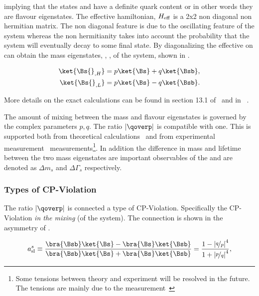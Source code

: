 \noindent implying that the states \Bs and \Bsb have a definite quark content or in other words
they are flavour eigenstates. The effective hamiltonian, $H_{\rm eff}$ is a 2x2 non diagonal non hermitian matrix.
The non diagonal feature is due to the oscillating feature of the \BBbarSyst system whereas the non
hermitianity takes into account the probability that the system will eventually decay to some final state.
By diagonalizing the effective on can obtain the mass eigenstates, , , of the system, shown in .

\begin{align}
 \ket{\Bs{}_{,H}} &= p \ket{\Bs} + q \ket{\Bsb}, \nonumber \\
 \ket{\Bs{}_{,L}} &= p \ket{\Bs} - q \ket{\Bsb}.
\label{bs_mass_eigen}
\end{align}

More details on the exact calculations can be found in section 13.1 of~\cite{PDG} and in ~\cite{jeroenThesis,DeBruyn-thesis}.

The amount of mixing between the mass and flavour eigenstates is governed by the complex parameters $p,q$.
The ratio $|\qoverp|$ is compatible with one. This is supported both from theoretical calculations~\cite{Lenz:2011ti}
and from experimental measurement~\cite{asl-paper} measurements\footnote{Some tensions between theory and experiment will be resolved in the future. The tensions are
mainly due to the \dzero measurement~\cite{Abazov:2013uma}}. In addition the difference in mass and lifetime between the two
mass eigenstates are important observables of the \BBbarSyst and are denoted as $\Delta m_s$ and $\Delta\Gamma_s$ respectively.

\subsubsection{Types of CP-Violation}
The ratio $|\qoverp|$ is connected a type of CP-Violation. Specifically the CP-Violation {\it in the mixing} (of the \BBbarSyst system).
The connection is shown in the asymmetry of .

\begin{equation}
a_{\rm sl}^{s}  \equiv \frac{\bra{\Bsb}\ket{\Bs} - \bra{\Bs}\ket{\Bsb}} {\bra{\Bsb}\ket{\Bs} + \bra{\Bs}\ket{\Bsb}}
                     = \frac{1 - \left|\nicefrac{q}{p}\right|^4}{1 + \left|\nicefrac{p}{q}\right|^4},
\label{acp_mixing}
\end{equation}

